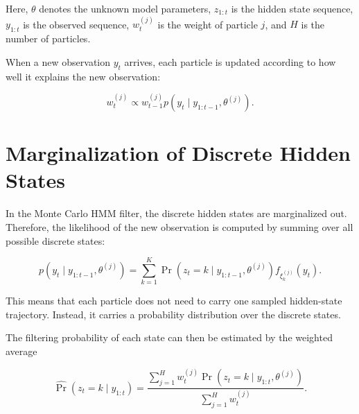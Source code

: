 \documentclass[a4paper]{article}
\begin{document}
        Here, \(\theta\) denotes the unknown model parameters, \(z_{1:t}\) is the hidden state sequence, \(y_{1:t}\) is the observed sequence, \(w_t^{(j)}\) is the weight of particle \(j\), and \(H\) is the number of particles.
        
        When a new observation \(y_t\) arrives, each particle is updated according to how well it explains the new observation:
        
        \[
            w_t^{(j)}
            \propto
            w_{t-1}^{(j)}
            p
            \left(
                y_t
                \mid
                y_{1:t-1},
                \theta^{(j)}
            \right).
        \]
    
    
    \section{Marginalization of Discrete Hidden States}
        
        In the Monte Carlo HMM filter, the discrete hidden states are marginalized out. Therefore, the likelihood of the new observation is computed by summing over all possible discrete states:
        
        \[
            p
            \left(
                y_t
                \mid
                y_{1:t-1},
                \theta^{(j)}
            \right)
            =
            \sum_{k=1}^{K}
            \Pr
            \left(
                z_t = k
                \mid
                y_{1:t-1},
                \theta^{(j)}
            \right)
            f_{\xi_k^{(j)}}(y_t).
        \]
        
        This means that each particle does not need to carry one sampled hidden-state trajectory. Instead, it carries a probability distribution over the discrete states.
        
        The filtering probability of each state can then be estimated by the weighted average
        
        \[
            \widehat{\Pr}
            \left(
                z_t = k
                \mid
                y_{1:t}
            \right)
            =
            \frac{
                \sum_{j=1}^{H}
                w_t^{(j)}
                \Pr
                \left(
                    z_t = k
                    \mid
                    y_{1:t},
                    \theta^{(j)}
                \right)
            }{
                \sum_{j=1}^{H}
                w_t^{(j)}
            }.
        \]
    
\end{document}
